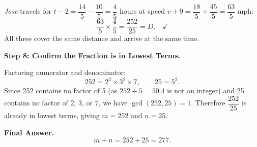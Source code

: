 \documentclass{article}
\begin{document}
\begin{tcolorbox}[title=The early training stage model (scaled):, breakable]
\textit{Jose} travels for $t - 2 = \dfrac{14}{5} - \dfrac{10}{5} = \dfrac{4}{5}$
hours at speed $v+9 = \dfrac{18}{5}+\dfrac{45}{5} = \dfrac{63}{5}$ mph:
\[
\frac{63}{5} \times \frac{4}{5} = \frac{252}{25} = D. \quad \checkmark
\]
All three cover the same distance and arrive at the same time.

\medskip
\textbf{Step 8: Confirm the Fraction is in Lowest Terms.}

Factoring numerator and denominator:
\[
252 = 2^2 \times 3^2 \times 7, \qquad 25 = 5^2.
\]
Since 252 contains no factor of 5 (as $252 \div 5 = 50.4$ is not an integer)
and 25 contains no factor of 2, 3, or 7, we have $\gcd(252, 25) = 1$.
Therefore $\dfrac{252}{25}$ is already in lowest terms, giving $m = 252$ and
$n = 25$.

\medskip
\textbf{Final Answer.}
\[
m + n = 252 + 25 = \boxed{277}.
\]

\end{tcolorbox}
\end{document}
